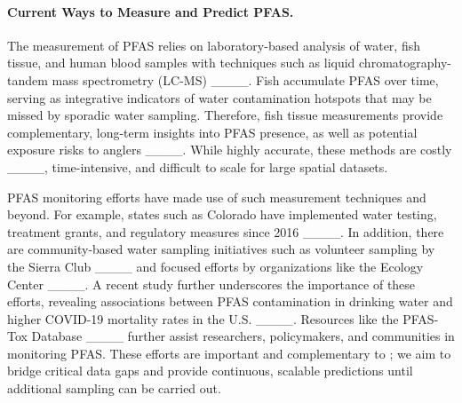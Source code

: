 \paragraph{Current Ways to Measure and Predict PFAS.}
The measurement of PFAS  relies on laboratory-based analysis of water, fish tissue, and human blood samples with techniques such as liquid chromatography-tandem mass spectrometry (LC-MS) ____. Fish accumulate PFAS over time, serving as integrative indicators of water contamination hotspots that may be missed by sporadic water sampling. Therefore, fish tissue measurements %
provide complementary, long-term  insights into PFAS presence, as well as potential exposure risks to anglers ____. While highly accurate, these methods are costly ____, time-intensive, and difficult to scale for large spatial datasets.

PFAS monitoring efforts have  made use of such  measurement techniques and beyond.  %
For example, states such as Colorado have implemented water testing, treatment grants, and regulatory measures since 2016 ____. In addition, there are community-based water sampling initiatives such as volunteer sampling by the Sierra Club ____ and focused efforts by  organizations like the  Ecology Center  ____. A recent study further underscores the importance of these efforts, revealing associations between PFAS contamination in drinking water and higher COVID-19 mortality rates in the U.S. ____. %
Resources like the PFAS-Tox Database ____ further assist researchers,  policymakers, and communities in monitoring PFAS. 
These efforts are important and complementary to \pname; we aim to  bridge critical data gaps and provide continuous, scalable predictions until additional sampling can be carried out.

